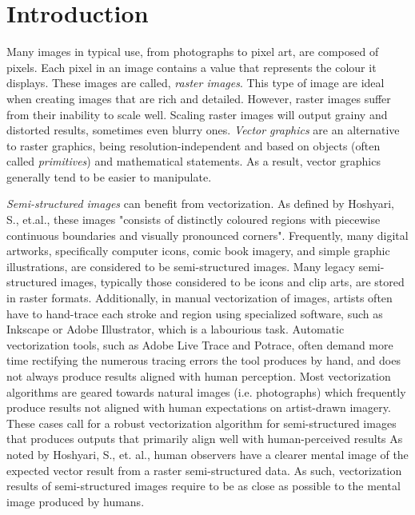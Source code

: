 \chapter{Introduction} \label{sec:intro}

Many images in typical use, from photographs to pixel art, are composed of pixels. Each pixel in an image contains a value that represents the colour it displays. These images are called, \textit{raster images}. This type of image are ideal when creating images that are rich and detailed. However, raster images suffer from their inability to scale well. Scaling raster images will output grainy and distorted results, sometimes even blurry ones\cite{rastervsvectorgraphics}. \textit{Vector graphics} are an alternative to raster graphics, being resolution-independent and based on objects (often called \textit{primitives}) and mathematical statements\cite{barendrecht2018locally}\cite{rastervsvector}. As a result, vector graphics generally tend to be easier to manipulate\cite{barendrecht2018locally}.

\textit{Semi-structured images} can benefit from vectorization. As defined by Hoshyari, S., et.al., these images "consists of distinctly coloured regions with piecewise continuous boundaries and visually pronounced corners". Frequently, many digital artworks, specifically computer icons, comic book imagery, and simple graphic illustrations, are considered to be semi-structured images. Many legacy semi-structured images, typically those considered to be icons and clip arts, are stored in raster formats\cite{hoshyari2018perceptiondriven}. Additionally, in manual vectorization of images, artists often have to hand-trace each stroke and region using specialized software, such as Inkscape or Adobe Illustrator, which is a labourious task\cite{matheson2018smoothing}. Automatic vectorization tools, such as Adobe Live Trace and Potrace, often demand more time rectifying the numerous tracing errors the tool produces by hand\cite{matheson2018smoothing}, and does not always produce results aligned with human perception\cite{hoshyari2018perceptiondriven}. Most vectorization algorithms are geared towards natural images (i.e. photographs) which frequently produce results not aligned with human expectations on artist-drawn imagery\cite{hoshyari2018perceptiondriven}. These cases call for a robust vectorization algorithm for semi-structured images that produces outputs that primarily align well with human-perceived results  As noted by Hoshyari, S., et. al., human observers have a clearer mental image of the expected vector result from a raster semi-structured data. As such, vectorization results of semi-structured images require to be as close as possible to the mental image produced by humans\cite{hoshyari2018perceptiondriven}.

